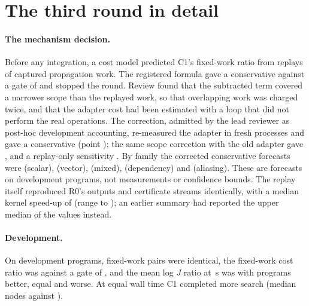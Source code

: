 \documentclass[11pt,a4paper]{article}
\begin{document}
\section{The third round in detail}\label{sec:third}

\paragraph{The mechanism decision.} Before any integration, a cost model predicted
C1's fixed-work ratio from replays of captured propagation work. The registered
formula gave a conservative  against a gate of  and stopped the
round. Review found that the subtracted term covered a narrower scope than the
replayed work, so that overlapping work was charged twice, and that the adapter
cost had been estimated with a loop that did not perform the real operations. The
correction, admitted by the lead reviewer as post-hoc development accounting,
re-measured the adapter in  fresh processes and gave a conservative
 (point ); the same scope correction with the old adapter gave
, and a replay-only sensitivity . By family the
corrected conservative forecasts were  (scalar), 
(vector),  (mixed),  (dependency) and
 (aliasing). These are forecasts on  development
programs, not measurements or confidence bounds. The replay itself reproduced R0's
outputs and certificate streams identically, with a median kernel speed-up of
 (range  to ); an earlier summary had
reported the upper median of the  values instead.

\paragraph{Development.} On  development programs, 
fixed-work pairs were identical, the fixed-work cost ratio was  against a
gate of , and the mean log $J$ ratio at \,s was  with
 programs better,  equal and  worse. At equal wall
time C1 completed more search (median  nodes against ).
\end{document}
